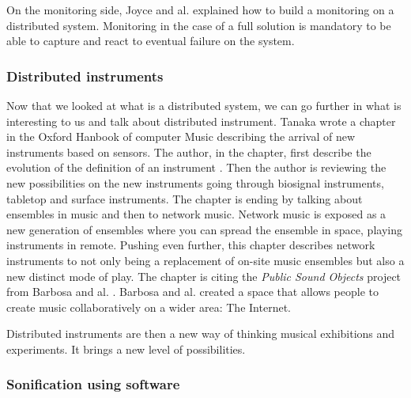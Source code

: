 On the monitoring side, Joyce and al. \cite{joyceMonitoringDistributedSystems} explained how to build a monitoring
on a distributed system. Monitoring in the case of a full solution is mandatory to be able to capture and react to eventual
failure on the system.


\subsubsection{Distributed instruments}

Now that we looked at what is a distributed system, we can go further in what is interesting to us and talk about 
distributed instrument. Tanaka wrote a chapter in the Oxford Hanbook of computer Music \cite{deanOxfordHandbookComputer2009} 
describing the arrival of new instruments based on sensors.
The author, in the chapter, first describe the evolution of the definition of an instrument \cite{tanaka2009sensor}.
Then the author is reviewing the new possibilities on the new instruments going through biosignal instruments, tabletop
and surface instruments. The chapter is ending by talking about ensembles in music and then to network music.
Network music is exposed as a new generation of ensembles where you can spread the ensemble in space, playing
instruments in remote. Pushing even further, this chapter describes network instruments to not only being a replacement
of on-site music ensembles but also a new distinct mode of play.
The chapter is citing the \textit{Public Sound Objects} project from Barbosa and al. \cite{barbosaPublicSoundObjects2002}.
Barbosa and al. created a space that allows people to create music collaboratively on a wider area: The Internet.



Distributed instruments are then a new way of thinking musical exhibitions and experiments. It brings a new level of possibilities.





\subsubsection{Sonification using software}